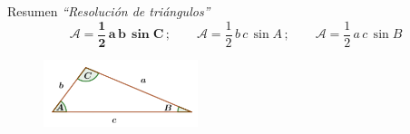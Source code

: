 \begin{myblock}{Resumen \emph{``Resolución de triángulos''}}
$$ \boldsymbol{\mathcal A=\dfrac 1 2 \, a\, b\, \sin C}\, ; \qquad \mathcal A=\dfrac 1 2 \, b\, c\, \sin A\, ; \qquad \mathcal A=\dfrac 1 2 \, a\, c\, \sin B$$

\begin{figure}[H]
	\centering
	\includegraphics[width=0.4\textwidth]{img-triang/triang01.png}
\end{figure}
\end{myblock}

